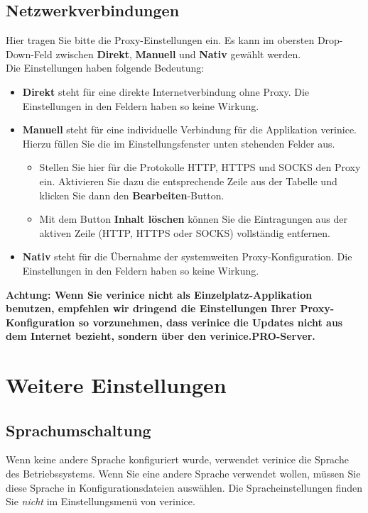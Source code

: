 \documentclass[a4paper,10pt]{book}
\begin{document}
\section{Netzwerkverbindungen}
Hier tragen Sie bitte die Proxy-Einstellungen ein. Es kann im obersten Drop-Down-Feld zwischen \textbf{Direkt}, \textbf{Manuell} und \textbf{Nativ} gewählt werden.
\newline\\
Die Einstellungen haben folgende Bedeutung:
\begin{itemize}
 \item \textbf{Direkt} steht für eine direkte Internetverbindung ohne Proxy. Die Einstellungen in den Feldern haben so keine Wirkung.
 \item \textbf{Manuell} steht für eine individuelle Verbindung für die Applikation verinice. Hierzu füllen Sie die im Einstellungsfenster unten stehenden Felder aus.
  \begin{itemize}
   \item Stellen Sie hier für die Protokolle HTTP, HTTPS und SOCKS den Proxy ein. Aktivieren Sie dazu die entsprechende Zeile aus der Tabelle und klicken Sie dann den \textbf{Bearbeiten}-Button.
   \item Mit dem Button \textbf{Inhalt löschen} können Sie die Eintragungen aus der aktiven Zeile (HTTP, HTTPS oder SOCKS) vollständig entfernen.
  \end{itemize}
 \item \textbf{Nativ} steht für die Übernahme der systemweiten Proxy-Konfiguration. Die Einstellungen in den Feldern haben so keine Wirkung.
\end{itemize}
\textbf{Achtung: Wenn Sie verinice nicht als Einzelplatz-Applikation benutzen, empfehlen wir dringend die Einstellungen Ihrer Proxy-Konfiguration
so vorzunehmen, dass verinice die Updates nicht aus dem Internet bezieht, sondern über den verinice.\textsc{PRO}-Server.}

\chapter{Weitere Einstellungen}\label{chap:other-settings}

\section{Sprachumschaltung}
\label{sec:sprachumschaltung}
Wenn keine andere Sprache konfiguriert wurde, verwendet verinice die Sprache des Betriebssystems.
Wenn Sie eine andere Sprache verwendet wollen, müssen Sie diese Sprache in Konfigurationsdateien auswählen. Die Spracheinstellungen finden Sie \textit{nicht} im Einstellungsmenü von verinice.
\end{document}
